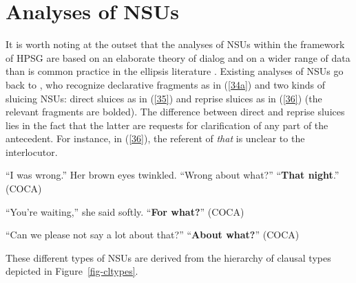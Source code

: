 {\section{Analyses of NSUs}
\label{sec-analyses-of-NSUs}

It is worth noting at the outset that the analyses of NSUs within the framework of HPSG are based on an elaborate theory of dialog  and on a wider range of data than is common practice in the ellipsis literature \citep{Ginzburg1994, Ginzburg2004, Ginzburg2014a, Larsson2002, Purver2006, Fernandez2006, Fernandez2002, Fernandez2007, Ginzburg2010, Ginzburg2014b, Ginzburg2012, Ginzburg2013, Kim2019}. Existing analyses of NSUs go back to \citet{Ginzburg:Sag:2000}, who recognize declarative fragments as in (\ref{34a}) and two kinds of sluicing NSUs: direct sluices as in (\ref{35}) and reprise sluices as  in (\ref{36}) (the relevant fragments are bolded). The difference between direct and reprise sluices lies in the fact that the latter are requests for clarification of any part of the antecedent. For instance, in (\ref{36}), the referent of \textit{that} is unclear to the interlocutor.

\ea ``I was wrong.'' Her brown eyes twinkled. ``Wrong about what?'' ``\textbf{That night}.'' (COCA) \label{34a}\z

\ea ``You're waiting,'' she said softly. ``\textbf{For what?}'' (COCA) \label{35} \z

\ea ``Can we please not say a lot about that?'' ``\textbf{About what?}'' (COCA) \label{36} \z


These different types of NSUs are derived from the \citet[333]{Ginzburg:Sag:2000} hierarchy of clausal types depicted in Figure~\ref{fig-cltypes}.


}
